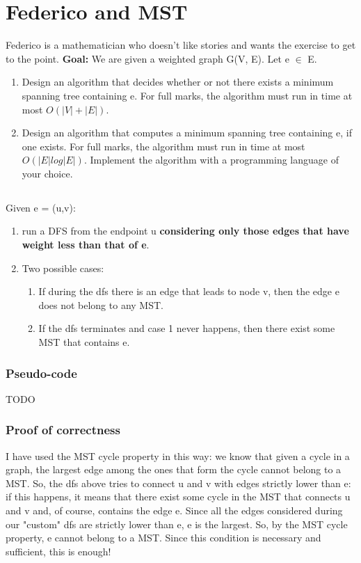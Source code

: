 \documentclass[12pt]{article}
\begin{document}
\section{}
\section{Federico and MST}
Federico is a mathematician who doesn't like stories and wants the exercise to get to the point.
\newline
\textbf{Goal:} We are given a weighted graph G(V, E). Let e $\in$ E.
\begin{enumerate}
	\item Design an algorithm that decides whether or not there exists a minimum spanning tree containing e. For full marks, the algorithm must run in time at most $O(|V | + |E|)$.
	\item Design an algorithm that computes a minimum spanning tree containing e, if one exists. For full marks, the algorithm must run in time at most $O(|E| log |E|)$. Implement the algorithm with a programming language of your choice.

\end{enumerate}
\subsection{}
Given e = (u,v):
\begin{enumerate}
	\item run a DFS from the endpoint u \textbf{considering only those edges that have weight less than that of e}.
	\item Two possible cases:
	\begin{enumerate}
		\item If during the dfs there is an edge that leads to node v, then the edge e does not belong to any MST.
		\item If the dfs terminates and case 1 never happens, then there exist some MST that contains e.
	\end{enumerate}
\end{enumerate}

\subsubsection{Pseudo-code}
TODO
\subsubsection{Proof of correctness}
I have used the MST cycle property in this way: we know that given a cycle in a graph, the largest edge among the ones that form the cycle cannot belong to a MST. So, the dfs above tries to connect u and v with edges strictly lower than e: if this happens, it means that there exist some cycle in the MST that connects u and v and, of course, contains the edge e. Since all the edges considered during our "custom" dfs are strictly lower than e, e is the largest. So, by the MST cycle property, e cannot belong to a MST. Since this condition is necessary and sufficient, this is enough!
\end{document}
